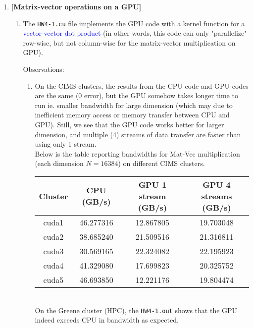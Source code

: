\documentclass[11pt]{article}
\begin{document}
\begin{enumerate}
    \item {\bf [Matrix-vector operations on a GPU]}
    \begin{enumerate}
        \item The \texttt{HW4-1.cu} file implements the GPU code with a kernel function for a \textcolor{blue}{vector-vector dot product} (in other words, this code can only "parallelize" row-wise, but not column-wise for the matrix-vector multiplication on GPU).
        
        Observations:
        \begin{enumerate}
            \item On the CIMS clusters, the results from the CPU code and GPU codes are the same (0 error), but the GPU somehow takes longer time to run ie. smaller bandwidth for large dimension (which may due to inefficient memory access or memory transfer between CPU and GPU). Still, we see that the GPU code works better for larger dimension, and multiple (4) streams of data transfer are faster than using only 1 stream.\\
            
            Below is the table reporting bandwidths for Mat-Vec multiplication (each dimension $N=16384$) on different CIMS clusters.\\
            
            \begin{tabular}{c|c|c|c}
            
           Cluster & CPU (GB/s)& GPU 1 stream (GB/s) & GPU 4 streams (GB/s) \\ \hline
            
            cuda1 & 46.277316 & 12.867805 & 19.703048 \\ \hline
            cuda2 & 38.685240 & 21.509516 & 21.316811\\ \hline
            cuda3 & 30.569165 & 22.324082 & 22.195923\\ \hline
            cuda4 & 41.329080 & 17.699823 & 20.325752\\ \hline
            cuda5 & 46.693850 & 12.221176 & 19.804474\\ \hline
            
            \end{tabular}\\
            
            On the Greene cluster (HPC), the \texttt{HW4-1.out} shows that the GPU indeed exceeds CPU in bandwidth as expected.
            

\end{enumerate}
\end{enumerate}
\end{enumerate}
\end{document}

